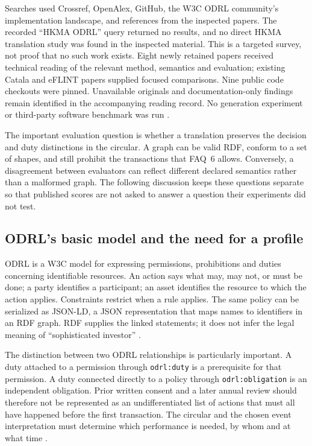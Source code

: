 Searches used Crossref, OpenAlex, GitHub, the W3C ODRL community's implementation
landscape, and references from the inspected papers. The recorded
``HKMA ODRL'' query returned no results, and no direct HKMA translation study
was found in the inspected material. This is a targeted survey, not proof
that no such work exists. Eight newly retained papers received technical
reading of the relevant method, semantics and evaluation; existing Catala
and eFLINT papers supplied focused comparisons. Nine public code checkouts
were pinned. Unavailable originals and documentation-only findings remain
identified in the accompanying reading record. No generation experiment or
third-party software benchmark was run \citep{hkmaodrlsurvey2026}.

The important evaluation question is whether a translation preserves the
decision and duty distinctions in the circular. A graph can be valid RDF,
conform to a set of shapes, and still prohibit the transactions that FAQ~6
allows. Conversely, a disagreement between evaluators can reflect different
declared semantics rather than a malformed graph. The following discussion
keeps these questions separate so that published scores are not asked to
answer a question their experiments did not test.

\subsection{ODRL's basic model and the need for a profile}

ODRL is a W3C model for expressing permissions, prohibitions and duties
concerning identifiable resources. An action says what may, may not, or must
be done; a party identifies a participant; an asset identifies the resource
to which the action applies. Constraints restrict when a rule applies.
The same policy can be serialized as JSON-LD, a JSON representation that
maps names to identifiers in an RDF graph. RDF supplies the linked statements;
it does not infer the legal meaning of ``sophisticated investor''
\citep[secs.~2--3]{odrlmodel2018}.

The distinction between two ODRL relationships is particularly important.
A duty attached to a permission through \texttt{odrl:duty} is a prerequisite
for that permission. A duty connected directly to a policy through
\texttt{odrl:obligation} is an independent obligation. Prior written consent
and a later annual review should therefore not be represented as an
undifferentiated list of actions that must all have happened before the first
transaction. The circular and the chosen event interpretation must determine
which performance is needed, by whom and at what time
\citep[secs.~2.6.1, 2.6.4--2.6.5]{odrlmodel2018}.

